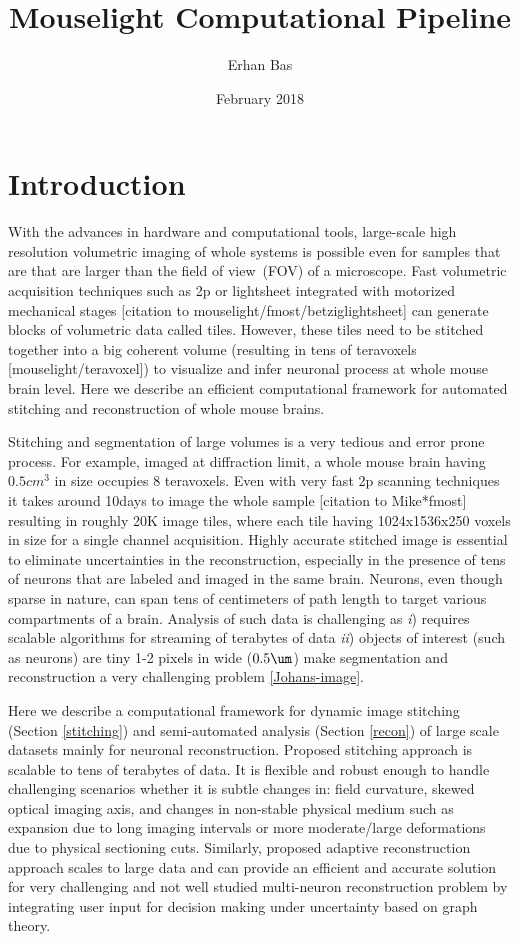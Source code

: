 \documentclass{article}
\title{Mouselight Computational Pipeline}
\author{Erhan Bas}
\date{February 2018}
\begin{document}
\maketitle

\section{Introduction}


With the advances in hardware and computational tools, large-scale high resolution volumetric imaging of whole systems is possible even for samples that are that are larger than the field of view~(FOV) of a microscope. Fast volumetric acquisition techniques such as 2p or lightsheet integrated with motorized mechanical stages [citation to mouselight/fmost/betziglightsheet] can generate blocks of volumetric data called tiles. However, these tiles need to be stitched together into a big coherent volume (resulting in tens of teravoxels [mouselight/teravoxel]) to visualize and infer neuronal process at whole mouse brain level. Here we describe an efficient computational framework for automated stitching and reconstruction of whole mouse brains.

Stitching and segmentation of large volumes is a very tedious and error prone process. For example, imaged at diffraction limit, a whole mouse brain having $0.5cm^3$ in size occupies 8 teravoxels. Even with very fast 2p scanning techniques it takes around 10days to image the whole sample [citation to Mike*fmost] resulting in roughly 20K image tiles, where each tile having 1024x1536x250 voxels in size for a single channel acquisition. Highly accurate stitched image is essential to eliminate uncertainties in the reconstruction, especially in the presence of tens of neurons that are labeled and imaged in the same brain. Neurons, even though sparse in nature, can span tens of centimeters of path length to target various compartments of a brain. Analysis of such data is challenging as \emph{i}) requires scalable algorithms for streaming of terabytes of data \emph{ii}) objects of interest (such as neurons) are tiny 1-2 pixels in wide ($0.5\um$) make segmentation and reconstruction a very challenging problem \ref{Johans-image}. 

Here we describe a computational framework for dynamic image stitching (Section \ref{stitching}) and semi-automated analysis (Section \ref{recon}) of large scale datasets mainly for neuronal reconstruction. Proposed stitching approach is scalable to tens of terabytes of data. It is flexible and robust enough to handle challenging scenarios whether it is subtle changes in: field curvature, skewed optical imaging axis, and changes in non-stable physical medium such as expansion due to long imaging intervals or more moderate/large deformations due to physical sectioning cuts. Similarly, proposed adaptive reconstruction approach scales to large data and can provide an efficient and accurate solution for very challenging and not well studied multi-neuron reconstruction problem by integrating user input for decision making under uncertainty based on graph theory. 
\end{document}

